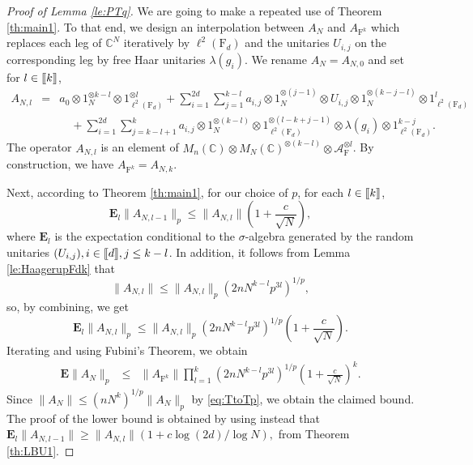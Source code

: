 \documentclass[11pt]{article}
\renewcommand{\star}{{\mathrm{F}}}
\newcommand{\cA}{\mathcal{A}}
\newcommand{\dE}{\mathbf {E}}
\newcommand{\dF}{\mathrm{F}}
\newcommand{\dC}{\mathbb {C}}
\newcommand{\PAR}[1]{{{\left(#1\right)}}} %
\newcommand{\1}{1\!\!{\sf I}}
\newcommand{\INT}[1]{{{\left[\hspace{-1.4pt}\left[#1\right]\hspace{-1.4pt}\right]}}}
\begin{document}
\begin{proof}[Proof of Lemma \ref{le:PTq}] We are going to make a repeated use of Theorem \ref{th:main1}. To that end, we design an interpolation between $A_N$ and $A_{\star^k}$ which replaces each leg of $\dC^N$ iteratively by $\ell^2(\dF_d)$ and the unitaries $U_{i,j}$ on the corresponding leg by free Haar unitaries $\lambda(g_i)$.   We rename $A_N=A_{N,0}$ and set for $l \in \INT{k}$,  
\begin{eqnarray*}
A_{N,l} & = & a_0 \otimes 1_N^{\otimes k-l}\otimes 1^{\otimes l}_{\ell^2(\dF_d)}  + \sum_{i=1}^{2d}\sum_{j=1}^{k-l}  a_{i,j} \otimes 1_N^{\otimes (j-1)} \otimes U_{i,j} \otimes 1_N^{\otimes (k-j-l)} \otimes 1^l_{\ell^2(\dF_d)}\\
& & \quad +\sum_{i=1}^{2d}\sum_{j=k-l+1}^{k}  a_{i,j} \otimes 1_N^{\otimes (k-l)} \otimes 1^{\otimes (l-k+j-1)}_{\ell^2(\dF_d)}  \otimes \lambda(g_{i}) \otimes 1^{k-j}_{\ell^2(\dF_d)}.
\end{eqnarray*}
The operator $A_{N,l}$ is an element of $M_n(\dC) \otimes M_N(\dC)^{\otimes(k-l)} \otimes \cA_\star^{\otimes l }$. By construction, we have $A_{\star^k} =A_{N,k}$. 

Next, according to Theorem \ref{th:main1}, for our choice of $p$, for each $l \in \INT{k}$,
$$
  \dE_{l} \|A_{N,l-1} \|_p  \leq  \| A_{N,l} \| \PAR{ 1 + \frac{c}{\sqrt  N}},
$$
where $\dE_{l}$ is the expectation conditional to the $\sigma$-algebra generated by the random unitaries  $(U_{i,j}), i \in \INT{d}, j \leq k-l$. In addition, it follows from Lemma \ref{le:HaagerupFdk} that
$$\| A_{N,l} \|\le \|A_{N,l} \|_p \PAR{ 2  n N^{k-l}p^{3l}}^{1/p},$$
so, by combining, we get 
$$
  \dE_{l} \|A_{N,l} \|_p  \leq  \| A_{N,l} \|_p \PAR{ 2 n N^{k-l}p^{3l}}^{1/p} \PAR{ 1 + \frac{c}{\sqrt  N}}.
$$
Iterating and using Fubini's Theorem, we obtain
\begin{eqnarray*}
 \dE \|A_{N} \|_p  & \leq &   \| A _{\star^k} \| \prod_{l=1}^k \PAR{2 n N^{k-l}p^{3l}}^{1/p} \PAR{ 1 + \frac{c}{\sqrt  N}}^k.
\end{eqnarray*}
Since $\| A_N \| \leq (n N^k)^{1/p} \|A_N\|_p$ by \eqref{eq:TtoTp}, we obtain the claimed bound. The proof of the lower bound is obtained by using instead that $
  \dE_{l} \|A_{N,l-1} \|  \geq  \| A_{N,l} \| \PAR{ 1 + c \log (2d) / \log  N},
$ from Theorem \ref{th:LBU1}.
\end{proof}
\end{document}
